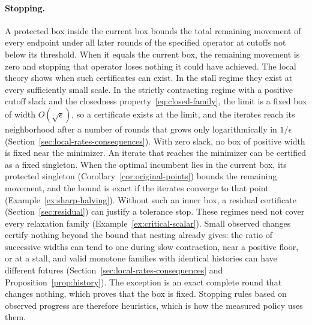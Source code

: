 \paragraph{Stopping.} A protected box inside the current box bounds the total
remaining movement of every endpoint under all later rounds of the
specified operator at cutoffs not below its threshold. When it equals the
current box, the remaining movement is zero and stopping that operator
loses nothing it could have achieved. The local theory shows when such
certificates can exist. In the stall regime they exist at every
sufficiently small scale. In the strictly contracting regime with a
positive cutoff slack and the closedness property~\eqref{eq:closed-family},
the limit is a fixed box of width $O(\sqrt\epsilon)$, so a certificate
exists at the limit, and the iterates reach its neighborhood after a number
of rounds that grows only logarithmically in $1/\epsilon$
(Section~\ref{sec:local-rates-consequences}). With zero slack, no box of
positive width is fixed near the minimizer. An iterate that reaches the
minimizer can be certified as a fixed singleton. When the optimal incumbent
lies in the current box, its protected singleton
(Corollary~\ref{cor:original-points}) bounds the remaining movement, and the
bound is exact if the iterates converge to that point
(Example~\ref{ex:sharp-halving}). Without such an inner box, a residual
certificate (Section~\ref{sec:residual}) can justify a tolerance stop.
These regimes need not cover every relaxation family
(Example~\ref{ex:critical-scalar}). Small observed changes certify nothing
beyond the bound that nesting already gives: the ratio of successive widths
can tend to one during slow contraction, near a positive floor, or at a
stall, and valid monotone families with identical histories can have
different futures (Section~\ref{sec:local-rates-consequences} and
Proposition~\ref{prop:history}). The exception is an exact complete round
that changes nothing, which proves that the box is fixed. Stopping rules based
on observed progress are therefore heuristics, which is how the measured
policy uses them.

